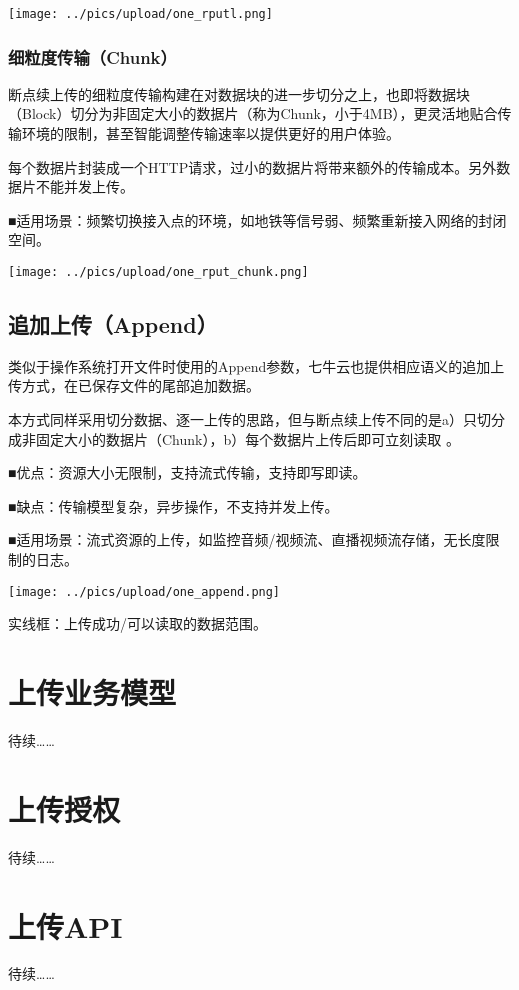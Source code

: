 \documentclass[11pt, oneside]{book}
\newcommand{\qpara}[1]{
\vspace{0.3em}
\noindent
#1\par
\vspace{0.3em}
}
\begin{document}
\begin{center}
\texttt{[image: ../pics/upload/one\_rputl.png]}
\end{center}

\subsection{细粒度传输（Chunk）}

\qpara{断点续上传的细粒度传输构建在对数据块的进一步切分之上，也即将数据块（Block）切分为非固定大小的数据片（称为Chunk，小于4MB），更灵活地贴合传输环境的限制，甚至智能调整传输速率以提供更好的用户体验。}
\qpara{每个数据片封装成一个HTTP请求，过小的数据片将带来额外的传输成本。另外数据片不能并发上传。}
\qpara{■\thinspace 适用场景：频繁切换接入点的环境，如地铁等信号弱、频繁重新接入网络的封闭空间。}

\begin{center}
\texttt{[image: ../pics/upload/one\_rput\_chunk.png]}
\end{center}

\section{追加上传（Append）}

\qpara{类似于操作系统打开文件时使用的Append参数，七牛云也提供相应语义的追加上传方式，在已保存文件的尾部追加数据。}
\qpara{本方式同样采用切分数据、逐一上传的思路，但与断点续上传不同的是a）只切分成非固定大小的数据片（Chunk），b）每个数据片上传后即可立刻读取 。}
\qpara{■\thinspace 优点：资源大小无限制，支持流式传输，支持即写即读。}
\qpara{■\thinspace 缺点：传输模型复杂，异步操作，不支持并发上传。}
\qpara{■\thinspace 适用场景：流式资源的上传，如监控音频/视频流、直播视频流存储，无长度限制的日志。}

\begin{center}
\texttt{[image: ../pics/upload/one\_append.png]}
\end{center}

\qpara{实线框：上传成功/可以读取的数据范围。}

\chapter{上传业务模型}

\qpara{待续……}

\chapter{上传授权}

\qpara{待续……}

\chapter{上传API}

\qpara{待续……}
\end{document}
